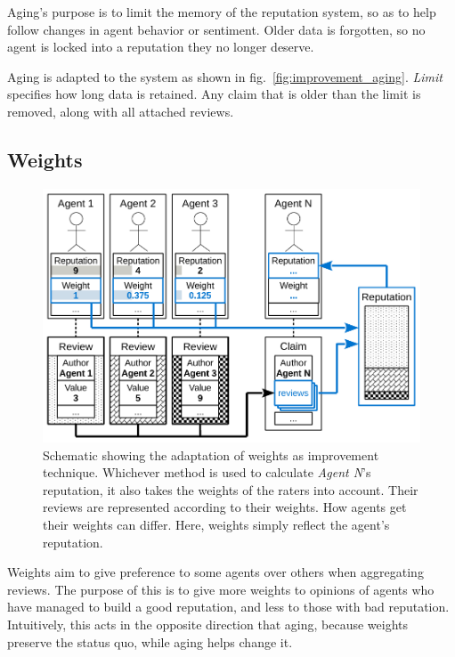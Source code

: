 \documentclass[%
    ]{\PathToTumTemplate/thesis/tum_thesis}
\begin{document}
Aging's purpose is to limit the memory of the reputation system, so as to help follow changes in agent behavior or sentiment.
Older data is forgotten, so no agent is locked into a reputation they no longer deserve.

Aging is adapted to the system as shown in fig.~\ref{fig:improvement_aging}.
\emph{Limit} specifies how long data is retained.
Any claim that is older than the limit is removed, along with all attached reviews.


\subsection{Weights}

\begin{figure}[tbp]
  \begin{center}
        \includegraphics[width=0.85\linewidth]	{../images/improvement_weights-crop.pdf}
    \caption{
    Schematic showing the adaptation of weights as improvement technique.
    Whichever method is used to calculate \emph{Agent N}'s reputation, it also takes the weights of the raters into account.
    Their reviews are represented according to their weights.
    How agents get their weights can differ.
    Here, weights simply reflect the agent's reputation.
    }
    \label{fig:improvement_weights}
  \end{center}
\end{figure}

Weights aim to give preference to some agents over others when aggregating reviews.
The purpose of this is to give more weights to opinions of agents who have managed to build a good reputation, and less to those with bad reputation.
Intuitively, this acts in the opposite direction that aging, because weights preserve the status quo, while aging helps change it.
\end{document}
